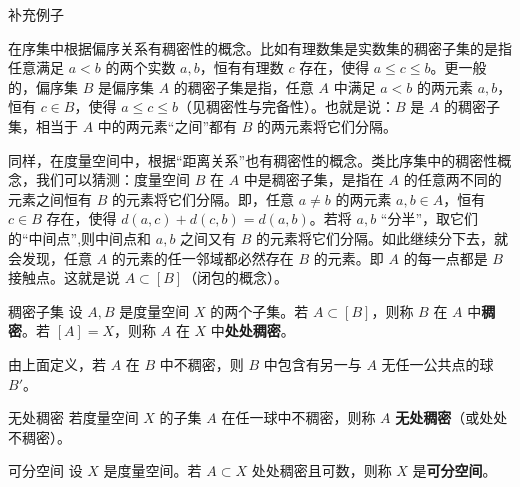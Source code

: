 
\begin{issues}
补充例子
\end{issues}

在序集中根据偏序关系有稠密性的概念。比如有理数集是实数集的稠密子集的是指任意满足 $a<b$ 的两个实数 $a,b$，恒有有理数 $c$ 存在，使得 $a\leq c\leq b$。更一般的，偏序集 $B$ 是偏序集 $A$ 的稠密子集是指，任意 $A$ 中满足 $a<b$ 的两元素 $a,b$，恒有 $c\in B$，使得 $a\leq c\leq b$（见稠密性与完备性）。也就是说：$B$ 是 $A$ 的稠密子集，相当于 $A$ 中的两元素“之间”都有 $B$ 的两元素将它们分隔。

同样，在度量空间中，根据“距离关系”也有稠密性的概念。类比序集中的稠密性概念，我们可以猜测：度量空间 $B$ 在 $A$ 中是稠密子集，是指在 $A$ 的任意两不同的元素之间恒有 $B$ 的元素将它们分隔。即，任意 $a\neq b$ 的两元素 $a,b\in A$，恒有 $c\in B$ 存在，使得 $d(a,c)+d(c,b)=d(a,b)$。若将 $a,b$ “分半”，取它们的“中间点”,则中间点和 $a,b$ 之间又有 $B$ 的元素将它们分隔。如此继续分下去，就会发现，任意 $A$ 的元素的任一邻域都必然存在 $B$ 的元素。即 $A$ 的每一点都是 $B$ 接触点。这就是说 $A\subset [B]$（闭包的概念）。

\begin{definition}{稠密子集}\label{def_MaDen_2}
设 $A,B$ 是度量空间 $X$ 的两个子集。若 $A\subset [B]$，则称 $B$ 在 $A$ 中\textbf{稠密}。若 $[A]=X$，则称 $A$ 在 $X$ 中\textbf{处处稠密}。
\end{definition}

由上面定义，若 $A$ 在 $B$ 中不稠密，则 $B$ 中包含有另一与 $A$ 无任一公共点的球 $B'$。
\begin{definition}{无处稠密}\label{def_MaDen_1}
若度量空间 $X$ 的子集 $A$ 在任一球中不稠密，则称 $A$ \textbf{无处稠密}（或处处不稠密）。
\end{definition}

\begin{definition}{可分空间}
设 $X$ 是度量空间。若 $A\subset X$ 处处稠密且可数，则称 $X$ 是\textbf{可分空间}。
\end{definition}


